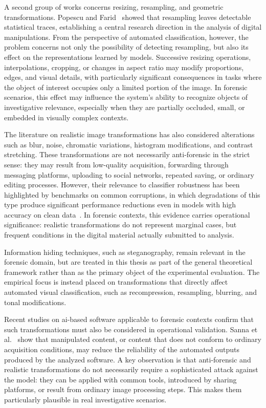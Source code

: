 A second group of works concerns resizing, resampling, and geometric
transformations. Popescu and Farid~\cite{popescu2005exposing} showed that
resampling leaves detectable statistical traces, establishing a central
research direction in the analysis of digital manipulations. From the
perspective of automated classification, however, the problem concerns not only
the possibility of detecting resampling, but also its effect on the
representations learned by models. Successive resizing operations,
interpolations, cropping, or changes in aspect ratio may modify proportions,
edges, and visual details, with particularly significant consequences in tasks
where the object of interest occupies only a limited portion of the image. In
forensic scenarios, this effect may influence the system's ability to recognize
objects of investigative relevance, especially when they are partially
occluded, small, or embedded in visually complex contexts.

The literature on realistic image transformations has also considered
alterations such as blur, noise, chromatic variations, histogram modifications,
and contrast stretching. These transformations are not necessarily
anti-forensic in the strict sense: they may result from low-quality
acquisition, forwarding through messaging platforms, uploading to social
networks, repeated saving, or ordinary editing processes. However, their
relevance to classifier robustness has been highlighted by benchmarks on common
corruptions, in which degradations of this type produce significant performance
reductions even in models with high accuracy on clean
data~\cite{hendrycks2019benchmarking}. In forensic contexts, this evidence
carries operational significance: realistic transformations do not represent
marginal cases, but frequent conditions in the digital material actually
submitted to analysis.

Information hiding techniques, such as steganography, remain relevant in the
forensic domain, but are treated in this thesis as part of the general
theoretical framework rather than as the primary object of the experimental
evaluation. The empirical focus is instead placed on transformations that
directly affect automated visual classification, such as recompression,
resampling, blurring, and tonal modifications.

Recent studies on \gls{ai}-based software applicable to forensic contexts
confirm that such transformations must also be considered in operational
validation. Sanna et al.~\cite{sanna2024preliminary,sanna2025pixelperfect}
show that manipulated content, or content that does not conform to ordinary
acquisition conditions, may reduce the reliability of the automated outputs
produced by the analyzed software. A key observation is that anti-forensic and
realistic transformations do not necessarily require a sophisticated attack
against the model: they can be applied with common tools, introduced by sharing
platforms, or result from ordinary image processing steps. This makes them
particularly plausible in real investigative scenarios.

